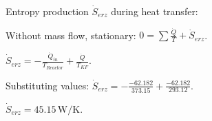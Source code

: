 Entropy production \( \dot{S}_{erz} \) during heat transfer:  

Without mass flow, stationary:  
\( 0 = \sum \frac{\dot{Q}}{T} + \dot{S}_{erz} \).  

\( \dot{S}_{erz} = -\frac{\dot{Q}_{in}}{T_{Reactor}} + \frac{\dot{Q}}{T_{KF}} \).  

Substituting values:  
\( \dot{S}_{erz} = -\frac{-62.182}{373.15} + \frac{-62.182}{293.12} \).  

\( \dot{S}_{erz} = 45.15 \, \text{W/K} \).